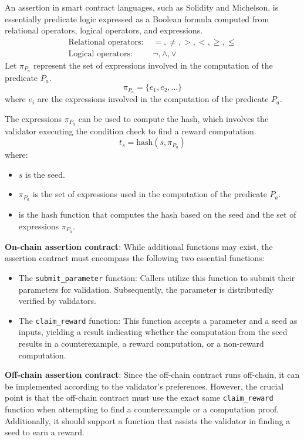 \documentclass[runningheads]{llncs}
\begin{document}
An assertion in smart contract languages, such as Solidity and Michelson, is essentially predicate logic expressed as a Boolean formula computed from relational operators, logical operators, and expressions. 
\begin{align}
\text{Relational operators: } & =, \neq, >, <, \geq, \leq \\
\text{Logical operators: } & \neg, \land, \lor
\end{align}
Let $\pi_{P_{a}}$ represent the set of expressions involved in the computation of the predicate $P_a$.
\begin{equation}
\pi_{P_{a}} = \{ e_1, e_2, \ldots \}
\end{equation}
where $e_i$ are the expressions involved in the computation of the predicate $P_a$.

 The expressions $\pi_{P_a}$ can be used to compute the hash, which involves the validator executing the condition check to find a reward computation.
\begin{equation}
t_s = \text{hash}(s, \pi_{P_{a}})
\end{equation}
where:
\begin{itemize}
    \item $s$ is the seed.
    \item $\pi_{P_{a}}$ is the set of expressions used in the computation of the predicate $P_a$.
    \item {} is the hash function that computes the hash based on the seed and the set of expressions $\pi_{P_{a}}$.
\end{itemize}
\textbf{On-chain assertion contract}:
While additional functions may exist, the assertion contract must encompass the following two essential functions:
\begin{itemize}
\item The \lstinline|submit_parameter| function: Callers utilize this function to submit their parameters for validation. Subsequently, the parameter is distributedly verified by validators.
\item  The \lstinline|claim_reward| function: This function accepts a parameter and a seed as inputs, yielding a result indicating whether the computation from the seed results in a counterexample, a reward computation, or a non-reward computation.
\end{itemize}
\textbf{Off-chain assertion contract}:
Since the off-chain contract runs off-chain, it can be implemented according to the validator's preferences. However, the crucial point is that the off-chain contract must use the exact same \lstinline|claim_reward| function when attempting to find a counterexample or a computation proof. Additionally, it should support a function that assists the validator in finding a seed to earn a reward.
\end{document}

